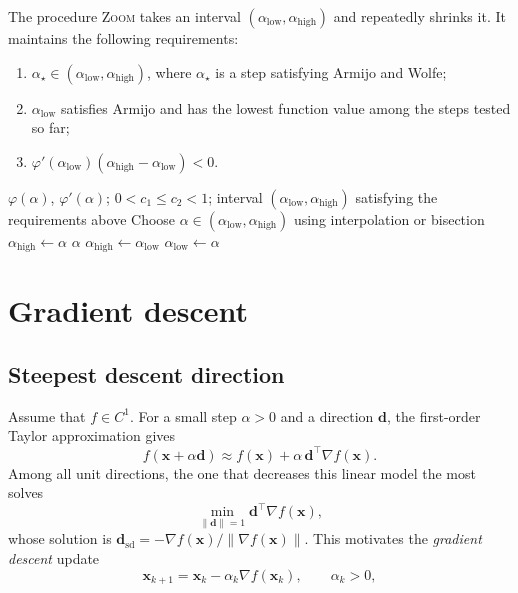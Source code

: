 \noindent The procedure \textsc{Zoom} takes an interval
$(\alpha_{\mathrm{low}},\alpha_{\mathrm{high}})$ and repeatedly shrinks it. It
maintains the following requirements:
\begin{enumerate}
  \item $\alpha_\star\in(\alpha_{\mathrm{low}},\alpha_{\mathrm{high}})$, where
  $\alpha_\star$ is a step satisfying Armijo and Wolfe;
  \item $\alpha_{\mathrm{low}}$ satisfies Armijo and has the lowest function
  value among the steps tested so far;
  \item $\varphi'(\alpha_{\mathrm{low}})
  (\alpha_{\mathrm{high}}-\alpha_{\mathrm{low}})<0$.
\end{enumerate}


\begin{algorithm}[ht]
  \caption{\textsc{Zoom}$(\alpha_{\mathrm{low}},\alpha_{\mathrm{high}})$}
  \label{alg:zoom}
  \begin{algorithmic}
    \REQUIRE $\varphi(\alpha)$, $\varphi'(\alpha)$; $0<c_1\le c_2<1$; interval
    $(\alpha_{\mathrm{low}},\alpha_{\mathrm{high}})$ satisfying the requirements above
      \STATE Choose $\alpha\in(\alpha_{\mathrm{low}},\alpha_{\mathrm{high}})$
      using interpolation or bisection
        \STATE $\alpha_{\mathrm{high}}\gets \alpha$
      \ELSE
          \RETURN $\alpha$
        \ENDIF
          \STATE $\alpha_{\mathrm{high}}\gets \alpha_{\mathrm{low}}$
        \ENDIF
        \STATE $\alpha_{\mathrm{low}}\gets \alpha$
      \ENDIF
    \ENDWHILE
  \end{algorithmic}
\end{algorithm}


\section{Gradient descent}
\label{sec:gradient-descent}
\subsection{Steepest descent direction}
Assume that $f \in C^1$. For a small step $\alpha>0$ and a direction
$\mathbf{d}$, the first-order Taylor approximation gives
\[
  f(\mathbf{x}+\alpha \mathbf{d})\approx f(\mathbf{x})+\alpha\,\mathbf{d}^\top \nabla f(\mathbf{x}).
\]
Among all unit directions, the one that decreases this linear model the most
solves
\[
  \min_{\|\mathbf{d}\|=1} \mathbf{d}^\top \nabla f(\mathbf{x}),
\]
whose solution is
$\mathbf{d}_{\mathrm{sd}}=-\nabla f(\mathbf{x})/\|\nabla f(\mathbf{x})\|$. This motivates the
\emph{gradient descent} update
\begin{equation}
  \label{eq:gd-update}
  \mathbf{x}_{k+1}=\mathbf{x}_k-\alpha_k \nabla f(\mathbf{x}_k),
  \qquad \alpha_k>0,
\end{equation}

